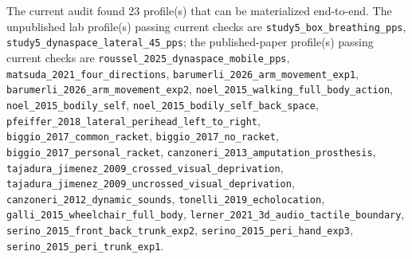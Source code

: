 \documentclass[11pt]{article}
\begin{document}
The current audit found 23 profile(s) that can be materialized end-to-end. The unpublished lab profile(s) passing current checks are \texttt{study5\_\allowbreak{}box\_\allowbreak{}breathing\_\allowbreak{}pps}, \texttt{study5\_\allowbreak{}dynaspace\_\allowbreak{}lateral\_\allowbreak{}45\_\allowbreak{}pps}; the published-paper profile(s) passing current checks are \texttt{roussel\_\allowbreak{}2025\_\allowbreak{}dynaspace\_\allowbreak{}mobile\_\allowbreak{}pps}, \texttt{matsuda\_\allowbreak{}2021\_\allowbreak{}four\_\allowbreak{}directions}, \texttt{barumerli\_\allowbreak{}2026\_\allowbreak{}arm\_\allowbreak{}movement\_\allowbreak{}exp1}, \texttt{barumerli\_\allowbreak{}2026\_\allowbreak{}arm\_\allowbreak{}movement\_\allowbreak{}exp2}, \texttt{noel\_\allowbreak{}2015\_\allowbreak{}walking\_\allowbreak{}full\_\allowbreak{}body\_\allowbreak{}action}, \texttt{noel\_\allowbreak{}2015\_\allowbreak{}bodily\_\allowbreak{}self}, \texttt{noel\_\allowbreak{}2015\_\allowbreak{}bodily\_\allowbreak{}self\_\allowbreak{}back\_\allowbreak{}space}, \texttt{pfeiffer\_\allowbreak{}2018\_\allowbreak{}lateral\_\allowbreak{}perihead\_\allowbreak{}left\_\allowbreak{}to\_\allowbreak{}right}, \texttt{biggio\_\allowbreak{}2017\_\allowbreak{}common\_\allowbreak{}racket}, \texttt{biggio\_\allowbreak{}2017\_\allowbreak{}no\_\allowbreak{}racket}, \texttt{biggio\_\allowbreak{}2017\_\allowbreak{}personal\_\allowbreak{}racket}, \texttt{canzoneri\_\allowbreak{}2013\_\allowbreak{}amputation\_\allowbreak{}prosthesis}, \texttt{tajadura\_\allowbreak{}jimenez\_\allowbreak{}2009\_\allowbreak{}crossed\_\allowbreak{}visual\_\allowbreak{}deprivation}, \texttt{tajadura\_\allowbreak{}jimenez\_\allowbreak{}2009\_\allowbreak{}uncrossed\_\allowbreak{}visual\_\allowbreak{}deprivation}, \texttt{canzoneri\_\allowbreak{}2012\_\allowbreak{}dynamic\_\allowbreak{}sounds}, \texttt{tonelli\_\allowbreak{}2019\_\allowbreak{}echolocation}, \texttt{galli\_\allowbreak{}2015\_\allowbreak{}wheelchair\_\allowbreak{}full\_\allowbreak{}body}, \texttt{lerner\_\allowbreak{}2021\_\allowbreak{}3d\_\allowbreak{}audio\_\allowbreak{}tactile\_\allowbreak{}boundary}, \texttt{serino\_\allowbreak{}2015\_\allowbreak{}front\_\allowbreak{}back\_\allowbreak{}trunk\_\allowbreak{}exp2}, \texttt{serino\_\allowbreak{}2015\_\allowbreak{}peri\_\allowbreak{}hand\_\allowbreak{}exp3}, \texttt{serino\_\allowbreak{}2015\_\allowbreak{}peri\_\allowbreak{}trunk\_\allowbreak{}exp1}.
\end{document}

